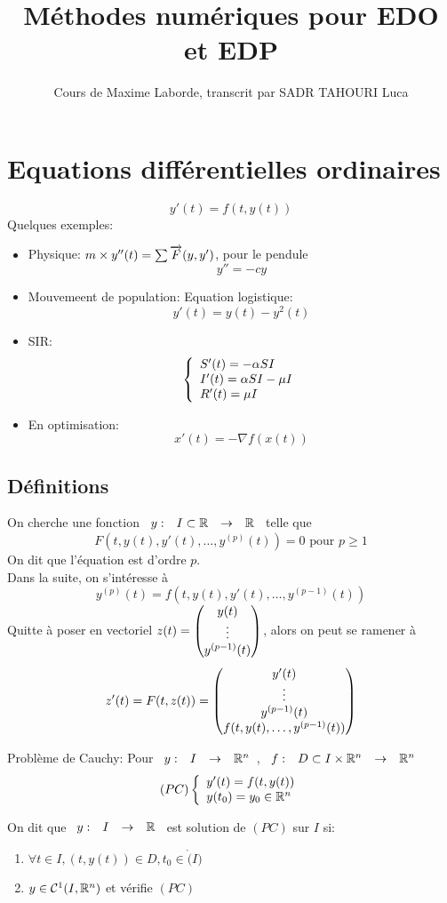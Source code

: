 \documentclass[]{report}
\title{Méthodes numériques pour EDO et EDP}
\author{Cours de Maxime Laborde, transcrit par SADR TAHOURI Luca}
\date{}
\begin{document}
    \maketitle
    \tableofcontents

    \chapter{Equations différentielles ordinaires}

    \[y'(t)=f(t,y(t))\]
    Quelques exemples:
    \begin{itemize}
        \item Physique: $m\times y''(t)=\sum \overrightarrow{F}(y,y')$, pour le pendule
        \[y''=-cy\]
        \item Mouvemeent de population: Equation logistique:
        \[y'(t)=y(t)-y^2(t)\]
        \item SIR:
        \[\left\{\begin{array}{ll} S'(t)=-\alpha S I\\ I'(t)=\alpha SI-\mu I \\ R'(t)=\mu I \end{array} \right.\]
        \item En optimisation:
        \[x'(t)=-\nabla f(x(t))\]
    \end{itemize}

    \section{Définitions}

    On cherche une fonction $\begin{array}{ccccc} y : & I\subset \mathbb{R} & \to & \mathbb{R} \end{array}$ telle que
    \[F(t,y(t),y'(t),\ldots,y^{(p)}(t))=0\text{ pour $p\ge 1$}\]
    On dit que l'équation est d'ordre $p$.\\
    Dans la suite, on s'intéresse à
    \[y^{(p)}(t)=f(t,y(t),y'(t),\ldots,y^{(p-1)}(t))\]
    Quitte à poser en vectoriel $z(t)=\left(\begin{matrix}y(t) \cr \vdots \cr y^{(p-1)}(t)\end{matrix}\right)$, alors on peut se ramener à
    \[z'(t)=F(t,z(t))=\left(\begin{matrix}
        y'(t)\cr \vdots \cr y^{(p-1)}(t)\cr f(t,y(t),\ldots,y^{(p-1)}(t))
    \end{matrix}\right)\]

    Problème de Cauchy: Pour $\begin{array}{ccccc} y : & I & \to & \mathbb{R}^n \end{array}$, $\begin{array}{ccccc} f : & D\subset I\times \mathbb{R}^n & \to & \mathbb{R}^n \end{array}$
    \[(PC)\left\{\begin{array}{ll} y'(t)=f(t,y(t))\\ y(t_0)=y_0\in \mathbb{R}^n \end{array} \right.\]

    \begin{df}{}{}
        On dit que $\begin{array}{ccccc} y : & I & \to & \mathbb{R} \end{array}$ est solution de $(PC)$ sur $I$ si:\\
        \begin{enumerate}
            \item $\forall t\in I,(t,y(t))\in D, t_0\in \mathring(I)$
            \item $y\in \mathcal{C}^1(I,\mathbb{R}^n)$ et vérifie $(PC)$
        \end{enumerate}
    \end{df}
\end{document}
